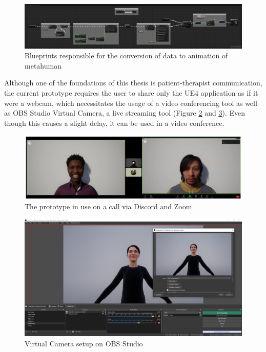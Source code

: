 \begin{figure}[!htb]
\includegraphics[width=\textwidth]{figures/facialConfig.png}
\centering
\caption{Blueprints responsible for the conversion of data to animation of metahuman}
\label{fig:blueprintAnimation}
\end{figure}

Although one of the foundations of this thesis is patient-therapist communication, the current prototype requires the user to share only the UE4 application as if it were a webcam, which necessitates the usage of a video conferencing tool as well as OBS Studio Virtual Camera, a live streaming tool (Figure \ref{fig:prototype} and \ref{fig:obs}). Even though this causes a slight delay, it can be used in a video conference.

\begin{figure}[!htb]
\includegraphics[width=\textwidth]{figures/zoomAndDiscord.PNG}
\centering
\caption{The prototype in use on a call via Discord and Zoom}
\label{fig:prototype}
\end{figure}

\begin{figure}[!htb]
\includegraphics[width=\textwidth]{figures/streamingTool.PNG}
\centering
\caption{Virtual Camera setup on OBS Studio}
\label{fig:obs}
\end{figure}

